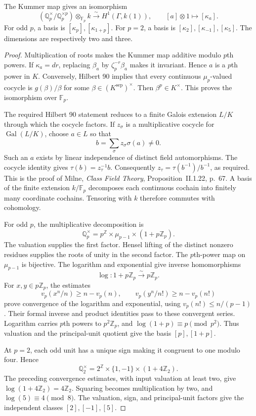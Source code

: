 \begin{proposition}
\label{v4-arith:local-cyclotomic:kummer}
The Kummer map gives an isomorphism
\[
 (\mathbb Q_p^\times/\mathbb Q_p^{\times p})\otimes_{\mathbb F_p}k
 \xrightarrow{\sim} H^1(\Gamma,k(1)),\qquad [a]\otimes1\longmapsto[\kappa_a].
\]
For odd \(p\), a basis is \([\kappa_p],[\kappa_{1+p}]\).
For \(p=2\), a basis is \([\kappa_2],[\kappa_{-1}],[\kappa_5]\).
The dimensions are respectively two and three.
\end{proposition}

\begin{proof}
Multiplication of roots makes the Kummer map additive modulo \(p\)th
powers. If \(\kappa_a=dr\), replacing \(\beta_a\) by
\(\zeta_p^{-r}\beta_a\) makes it invariant. Hence \(a\) is a \(p\)th
power in \(K\). Conversely, Hilbert 90 implies that every continuous
\(\mu_p\)-valued cocycle is \(g(\beta)/\beta\) for some
\(\beta\in(K^{\mathrm{sep}})^\times\). Then \(\beta^p\in K^\times\).
This proves the isomorphism over \(\mathbb F_p\).

The required Hilbert 90 statement reduces to a finite Galois extension
\(L/K\) through which the cocycle factors. If \(z_\sigma\) is a
multiplicative cocycle for \(\operatorname{Gal}(L/K)\), choose \(a\in L\)
so that
\[
 b=\sum_\sigma z_\sigma\sigma(a)\ne0.
\]
Such an \(a\) exists by linear independence of distinct field automorphisms.
The cocycle identity gives \(\tau(b)=z_\tau^{-1}b\).
Consequently \(z_\tau=\tau(b^{-1})/b^{-1}\), as required.
This is the proof of Milne, \emph{Class Field Theory}, Proposition~II.1.22, p.~67.
A basis of the finite extension \(k/\mathbb F_p\) decomposes each continuous
cochain into finitely many coordinate cochains. Tensoring with \(k\)
therefore commutes with cohomology.

For odd \(p\), the multiplicative decomposition is
\[
 \mathbb Q_p^\times=p^{\mathbb Z}\times\mu_{p-1}\times(1+p\mathbb Z_p).
\]
The valuation supplies the first factor. Hensel lifting of the distinct
nonzero residues supplies the roots of unity in the second factor.
The \(p\)th-power map on \(\mu_{p-1}\) is bijective.
The logarithm and exponential give inverse homomorphisms
\[
 \log:1+p\mathbb Z_p\xrightarrow{\sim}p\mathbb Z_p.
\]
For \(x,y\in p\mathbb Z_p\), the estimates
\[
 v_p(x^n/n)\ge n-v_p(n),\qquad
 v_p(y^n/n!)\ge n-v_p(n!)
\]
prove convergence of the logarithm and exponential, using
\(v_p(n!)\le n/(p-1)\). Their formal inverse
and product identities pass to these convergent series.
Logarithm carries \(p\)th powers to \(p^2\mathbb Z_p\), and
\(\log(1+p)\equiv p\pmod{p^2}\).
Thus valuation and the principal-unit quotient give the basis
\([p],[1+p]\).

At \(p=2\), each odd unit has a unique sign making it congruent to
one modulo four. Hence
\[
 \mathbb Q_2^\times=2^{\mathbb Z}\times\{1,-1\}\times(1+4\mathbb Z_2).
\]
The preceding convergence estimates, with input valuation at least two,
give \(\log(1+4\mathbb Z_2)=4\mathbb Z_2\).
Squaring becomes multiplication by two, and
\(\log(5)\equiv4\pmod8\). The valuation, sign, and principal-unit
factors give the independent classes \([2],[-1],[5]\).
\end{proof}

